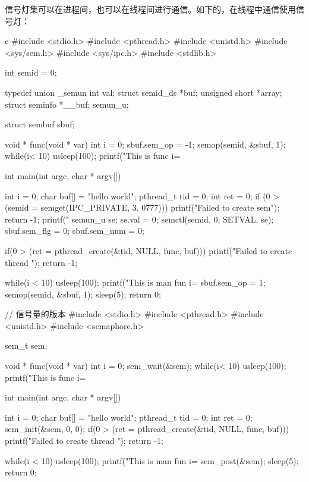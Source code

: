 信号灯集可以在进程间，也可以在线程间进行通信。如下的，在线程中通信使用信号灯：
\begin{code-block}{c}
#include <stdio.h>
#include <pthread.h>
#include <unistd.h>
#include <sys/sem.h>
#include <sys/ipc.h>
#include <stdlib.h>

int semid = 0;

typedef union _semun {
        int val;
        struct semid_ds *buf;
        unsigned short  *array;
        struct seminfo  *__buf;
}semun_u;

struct sembuf sbuf;

void * func(void * var)
{
        int i = 0;
        sbuf.sem_op = -1;
        semop(semid, &sbuf, 1);
        while(i< 10)
        {
                usleep(100);
                printf("This is func i=%
        }
}

int main(int argc, char * argv[])
{
        int i = 0;
        char buf[] = "hello world";
        pthread_t tid = 0;
        int ret = 0;
        if (0 > (semid = semget(IPC_PRIVATE, 3, 0777)))
        {
                printf("Failed to create sem\n");
                return -1;
        }
        printf("%
        semun_u se;
        se.val = 0;
        semctl(semid, 0, SETVAL, se);
        sbuf.sem_flg = 0;
        sbuf.sem_num = 0;

        if(0 > (ret = pthread_create(&tid, NULL, func, buf)))
        {
                printf("Failed to create thread \n");
                return -1;
        }

        while(i < 10)
        {
                usleep(100);
                printf("This is man fun i=%
        }
        sbuf.sem_op = 1;
        semop(semid, &sbuf, 1);
        sleep(5);
        return 0;
}

// 信号量的版本
#include <stdio.h>
#include <pthread.h>
#include <unistd.h>
#include <semaphore.h>

sem_t sem;

void * func(void * var)
{
        int i = 0;
        sem_wait(&sem);
        while(i< 10)
        {
                usleep(100);
                printf("This is func i=%
        }
}

int main(int argc, char * argv[])
{
        int i = 0;
        char buf[] = "hello world";
        pthread_t tid = 0;
        int ret = 0;
        sem_init(&sem, 0, 0);
        if(0 > (ret = pthread_create(&tid, NULL, func, buf)))
        {
                printf("Failed to create thread \n");
                return -1;
        }

        while(i < 10)
        {
                usleep(100);
                printf("This is man fun i=%
        }
        sem_post(&sem);
        sleep(5);
        return 0;
}
\end{code-block}

